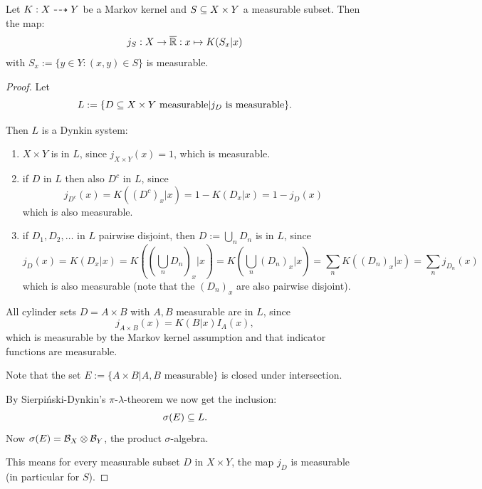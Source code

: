 \begin{Lem}
Let $K: X \dashrightarrow Y$ be a Markov kernel and $S \subseteq X \times Y$ a measurable subset.
Then the map:
  $$j_S: X \to \overline{\mathbb{R}} : x \mapsto K(S_x|x)$$
with $S_x := \{y \in Y : (x,y) \in S\}$ is measurable.
\end{Lem}
\begin{proof}
Let
  $$L := \{ D \subseteq X \times Y \text{ measurable} | j_D \text{ is measurable} \}.$$

Then $L$ is a Dynkin system:
\begin{enumerate}
  \item $X \times Y$ is in $L$, since $j_{X\times Y}(x) = 1$, which is measurable.
  \item if $D$ in $L$ then also $D^c$ in $L$, since
    $$j_{D^c}(x) = K((D^c)_x|x) = 1 - K(D_x|x) = 1 - j_D(x)$$
    which is also measurable.
  \item if $D_1,D_2,\dots$ in $L$ pairwise disjoint, then $D := \bigcup_n D_n$ is in $L$, since
    $$j_D(x) = K(D_x|x) = K((\bigcup_n D_n)_x|x) = K(\bigcup_n (D_n)_x|x) = \sum_n K((D_n)_x|x) = \sum_n j_{D_n}(x)$$
    which is also measurable (note that the $(D_n)_x$ are also pairwise disjoint).
\end{enumerate}

All cylinder sets $D = A \times B$ with $A,B$ measurable are in $L$, since
  $$j_{A\times B}(x) = K(B|x) I_A(x),$$
which is measurable by the Markov kernel assumption and that indicator 
functions are measurable. 

Note that the set $E:= \{ A \times B | A, B \text{ measurable} \}$ is closed under intersection.

By Sierpi\'nski-Dynkin's $\pi$-$\lambda$-theorem we now get the inclusion:
$$\sigma(E) \subseteq L.$$
Now $\sigma(E) = \mathcal{B}_X \otimes \mathcal{B}_Y$, the product $\sigma$-algebra.

This means for every measurable subset $D$ in $X \times Y$, the map $j_D$ is measurable (in particular for $S$).
\end{proof}

